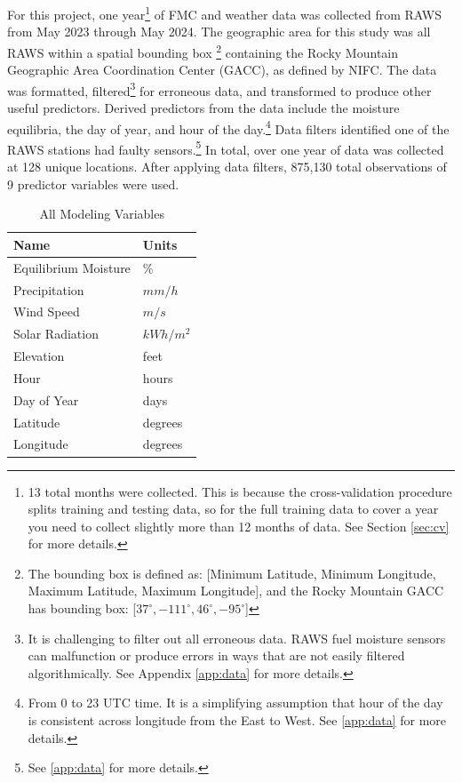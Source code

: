 \documentclass[11pt]{article}%
\begin{document}
For this project, one year\footnote{13 total months were collected. This is because the cross-validation procedure splits training and testing data, so for the full training data to cover a year you need to collect slightly more than 12 months of data. See Section \ref{sec:cv} for more details.} of FMC and weather data was collected from RAWS from May 2023 through May 2024. The geographic area for this study was all RAWS within a spatial bounding box
\footnote{
The bounding box is defined as: [Minimum Latitude, Minimum Longitude, Maximum Latitude, Maximum Longitude], and the Rocky Mountain GACC has bounding box: [$37^\circ, -111^\circ, 46^\circ, -95^\circ$]} 
containing the Rocky Mountain Geographic Area Coordination Center (GACC), as defined by NIFC.\cite{NIFC-2024-GAC} The data was formatted,  filtered\footnote{It is challenging to filter out all erroneous data. RAWS fuel moisture sensors can malfunction or produce errors in ways that are not easily filtered algorithmically. See Appendix \ref{app:data} for more details.} for erroneous data, and transformed to produce other useful predictors. Derived predictors from the data include the moisture equilibria, the day of year, and hour of the day.\footnote{From 0 to 23 UTC time. It is a simplifying assumption that hour of the day is consistent across longitude from the East to West. See \ref{app:data} for more details.} Data filters identified one of the RAWS stations had faulty sensors.\footnote{See \ref{app:data} for more details.} In total, over one year of data was collected at 128 unique locations. After applying data filters, 875,130 total observations of 9 predictor variables were used.

\begin{table}[ht]
\centering
\caption{All Modeling Variables}
\label{tab:all_vars}
\begin{tabular}{|l|l|}
\hline
\textbf{Name}           & \textbf{Units} \\  \hline
Equilibrium Moisture    & \%             \\ \hline
Precipitation           & $mm/h$           \\ \hline
Wind Speed              & $m/s$            \\ \hline
Solar Radiation         & $kWh/m^2$         \\ \hline
Elevation         & feet         \\ 
\hline
Hour                    & hours              \\ 
\hline
Day of Year             & days              \\ 
\hline
Latitude                & degrees              \\ 
\hline
Longitude               & degrees              \\ 
\hline

\end{tabular}
\end{table}
\end{document}

